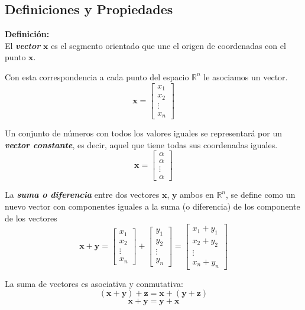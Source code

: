 \documentclass[12pt,letterpaper]{report} %
\begin{document}
\subsection{Definiciones y Propiedades}

\textbf{Definición:} \\

El \textit{\textbf{vector}} $\mathbf{x}$ es el segmento orientado que une el origen de coordenadas con el punto $\mathbf{x}$.

Con esta correspondencia a cada punto del espacio $\mathbb{R}^n$ le asociamos un vector.
$$
\mathbf{x}=\begin{bmatrix} x_1 \\ x_2 \\ \vdots \\ x_n\end{bmatrix}
$$

Un conjunto de números con todos los valores iguales se representará por un \textit{\textbf{vector constante}}, es decir, aquel que tiene todas sus coordenadas iguales.
$$
\mathbf{x}=\begin{bmatrix} \alpha \\ \alpha \\ \vdots \\ \alpha\end{bmatrix}
$$

La \textit{\textbf{suma o diferencia}} entre dos vectores $\mathbf{x}$, $\mathbf{y}$ ambos en $\mathbb{R}^n$, se define como un nuevo vector con componentes iguales a la suma (o diferencia) de los componente de los vectores
$$\mathbf{x}+\mathbf{y}=\begin{bmatrix} x_1 \\ x_2 \\ \vdots \\ x_n\end{bmatrix} + \begin{bmatrix} y_1 \\ y_2 \\ \vdots \\ y_n\end{bmatrix}=\begin{bmatrix} x_1+y_1\\ x_2+y_2 \\ \vdots \\ x_n+y_n\end{bmatrix}$$

La suma de vectores es asociativa y conmutativa:\\
$$(\mathbf{x}+\mathbf{y})+\mathbf{z}=\mathbf{x}+(\mathbf{y}+\mathbf{z})$$ 
$$\mathbf{x}+\mathbf{y}=\mathbf{y}+\mathbf{x}$$
\end{document}
